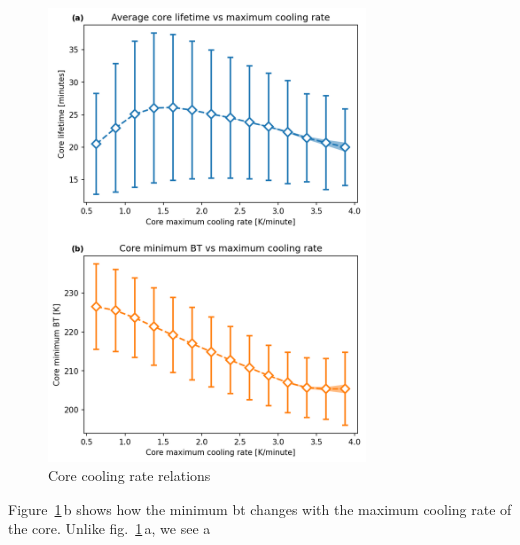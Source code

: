 \begin{figure}[tp]
    \centering
    \includegraphics[width=0.75\textwidth]{figures/ch2_10.png}
    \caption{Core cooling rate relations}
    \label{fig:core_cooling_rate_relations}
\end{figure}

Figure~\ref{fig:core_cooling_rate_relations}\,b shows how the minimum \acrshort{bt} changes with the maximum cooling rate of the core.
Unlike fig.~\ref{fig:core_cooling_rate_relations}\,a, we see a 

